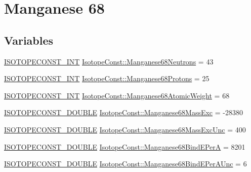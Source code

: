\hypertarget{group___isotope_const-_manganese-_mn68}{}\section{Manganese 68}
\label{group___isotope_const-_manganese-_mn68}
\subsection*{Variables}
\begin{DoxyCompactItemize}
\item 
\mbox{\hyperlink{group___isotope_const-_macros_ga5f18360b3e99483a35c32d789e62621c}{I\+S\+O\+T\+O\+P\+E\+C\+O\+N\+S\+T\+\_\+\+I\+NT}} \mbox{\hyperlink{group___isotope_const-_manganese-_mn68_gac682d9d89e76d4c5aa4506ad8f4ae13f}{Isotope\+Const\+::\+Manganese68\+Neutrons}} = 43
\item 
\mbox{\hyperlink{group___isotope_const-_macros_ga5f18360b3e99483a35c32d789e62621c}{I\+S\+O\+T\+O\+P\+E\+C\+O\+N\+S\+T\+\_\+\+I\+NT}} \mbox{\hyperlink{group___isotope_const-_manganese-_mn68_ga9adb55aa550e73d7561b670ebe9263f3}{Isotope\+Const\+::\+Manganese68\+Protons}} = 25
\item 
\mbox{\hyperlink{group___isotope_const-_macros_ga5f18360b3e99483a35c32d789e62621c}{I\+S\+O\+T\+O\+P\+E\+C\+O\+N\+S\+T\+\_\+\+I\+NT}} \mbox{\hyperlink{group___isotope_const-_manganese-_mn68_gac562ee46774d0b42c9c8a534da67fbdc}{Isotope\+Const\+::\+Manganese68\+Atomic\+Weight}} = 68
\item 
\mbox{\hyperlink{group___isotope_const-_macros_ga8f45a7272ce02c0b4c65c44636ed719a}{I\+S\+O\+T\+O\+P\+E\+C\+O\+N\+S\+T\+\_\+\+D\+O\+U\+B\+LE}} \mbox{\hyperlink{group___isotope_const-_manganese-_mn68_ga90b729dea090cddccef6f1aadea3bc76}{Isotope\+Const\+::\+Manganese68\+Mass\+Exc}} = -\/28380
\item 
\mbox{\hyperlink{group___isotope_const-_macros_ga8f45a7272ce02c0b4c65c44636ed719a}{I\+S\+O\+T\+O\+P\+E\+C\+O\+N\+S\+T\+\_\+\+D\+O\+U\+B\+LE}} \mbox{\hyperlink{group___isotope_const-_manganese-_mn68_ga2876be132f474e4c2b820f9cf561535a}{Isotope\+Const\+::\+Manganese68\+Mass\+Exc\+Unc}} = 400
\item 
\mbox{\hyperlink{group___isotope_const-_macros_ga8f45a7272ce02c0b4c65c44636ed719a}{I\+S\+O\+T\+O\+P\+E\+C\+O\+N\+S\+T\+\_\+\+D\+O\+U\+B\+LE}} \mbox{\hyperlink{group___isotope_const-_manganese-_mn68_ga008d3cfc39bc8afd995bc1718016a574}{Isotope\+Const\+::\+Manganese68\+Bind\+E\+PerA}} = 8201
\item 
\mbox{\hyperlink{group___isotope_const-_macros_ga8f45a7272ce02c0b4c65c44636ed719a}{I\+S\+O\+T\+O\+P\+E\+C\+O\+N\+S\+T\+\_\+\+D\+O\+U\+B\+LE}} \mbox{\hyperlink{group___isotope_const-_manganese-_mn68_gae781e27ea185ec71e57911a6e971d178}{Isotope\+Const\+::\+Manganese68\+Bind\+E\+Per\+A\+Unc}} = 6

\end{DoxyCompactItemize}
